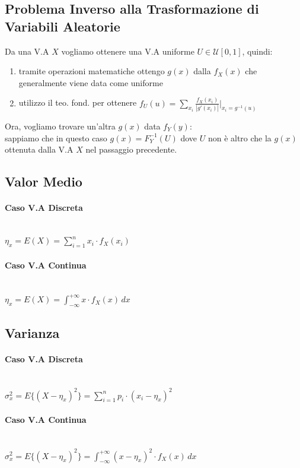 \documentclass{article}
\begin{document}
\subsection{Problema Inverso alla Trasformazione di Variabili Aleatorie}
Da una V.A $X$ vogliamo ottenere una V.A uniforme $U \in \mathcal{U}[0,1]$, quindi: 
\begin{enumerate}
    \item tramite operazioni matematiche ottengo $g(x)$ dalla $f_X(x)$ che generalmente viene data come uniforme
    \item utilizzo il teo. fond. per ottenere $f_U(u) = \sum_{x_i} \frac{f_X(x_i)}{|g'(x_i)|} \Big|_{x_i = g^{-1}(u)}$
\end{enumerate}
Ora, vogliamo trovare un'altra $g(x)$ data $f_Y(y)$: \\
sappiamo che in questo caso $g(x) = F_Y^{-1}(U)$ dove $U$ non è altro che la $g(x)$ ottenuta dalla V.A $X$ nel passaggio precedente.

\subsection{Valor Medio}
\paragraph{Caso V.A Discreta} ~\\
$\eta_x = E(X) = \sum_{i=1}^{n}x_i \cdot f_X(x_i) $

\paragraph{Caso V.A Continua} ~\\
$\eta_x = E(X) = \int_{- \infty}^{+\infty}x \cdot f_X(x) \,dx $

\subsection{Varianza}
\paragraph{Caso V.A Discreta} ~\\
$\sigma^2_x = E\big\{ (X-\eta_x)^2 \big\} = \sum_{i=1}^{n} p_i \cdot (x_i - \eta_x)^2$

\paragraph{Caso V.A Continua} ~\\
$\sigma^2_x = E\big\{ (X-\eta_x)^2 \big\} = \int_{- \infty}^{+\infty} (x-\eta_x)^2 \cdot f_X(x) \,dx $
\end{document}
